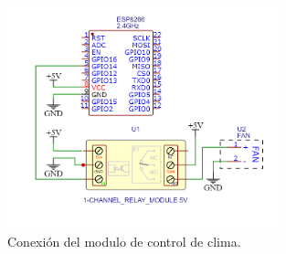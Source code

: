 \begin{figure}[!h]
	\centering
	\includegraphics[width=0.7\textwidth]{./Figures/vent_schem.png}
	\caption[Conexión del modulo de control de clima]{Conexión del modulo de control de clima.}
	\label{fig:ventschem}
\end{figure}


